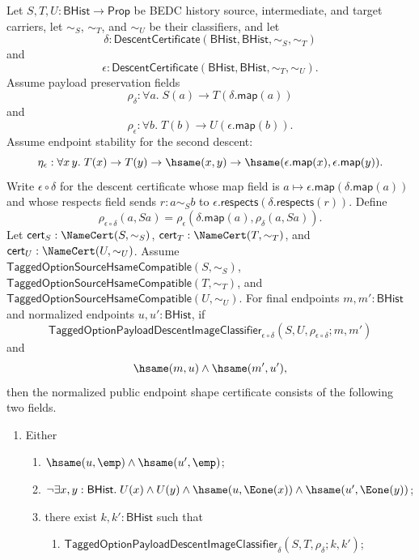 \begin{theorem}
\label{thm:tagged-option-composite-image-classifier-normalized-public-endpoint-shape-certificate}
Let $S,T,U:\mathsf{BHist}\to\mathsf{Prop}$ be BEDC history source,
intermediate, and target carriers, let $\sim_S$, $\sim_T$, and $\sim_U$ be their
classifiers, and let
$$
\delta:\mathsf{DescentCertificate}(\mathsf{BHist},\mathsf{BHist},\sim_S,\sim_T)
$$
and
$$
\epsilon:\mathsf{DescentCertificate}(\mathsf{BHist},\mathsf{BHist},\sim_T,\sim_U).
$$
Assume payload preservation fields
$$
\rho_{\delta}:\forall a.\;S(a)\to T(\delta.\mathsf{map}(a))
$$
and
$$
\rho_{\epsilon}:\forall b.\;T(b)\to U(\epsilon.\mathsf{map}(b)).
$$
Assume endpoint stability for the second descent:
$$
\eta_{\epsilon}:\forall x\,y.\;
T(x)\to T(y)\to \hsame(x,y)\to
\hsame(\epsilon.\mathsf{map}(x),\epsilon.\mathsf{map}(y)).
$$
Write $\epsilon\circ\delta$ for the descent certificate whose map field is
$a\mapsto\epsilon.\mathsf{map}(\delta.\mathsf{map}(a))$ and whose respects field
sends $r:a\sim_S b$ to
$\epsilon.\mathsf{respects}(\delta.\mathsf{respects}(r))$. Define
$$
\rho_{\epsilon\circ\delta}(a,Sa)=
\rho_{\epsilon}(\delta.\mathsf{map}(a),\rho_{\delta}(a,Sa)).
$$
Let $\mathsf{cert}_S:\NameCert(S,\sim_S)$,
$\mathsf{cert}_T:\NameCert(T,\sim_T)$, and
$\mathsf{cert}_U:\NameCert(U,\sim_U)$. Assume
$\mathsf{TaggedOptionSourceHsameCompatible}(S,\sim_S)$,
$\mathsf{TaggedOptionSourceHsameCompatible}(T,\sim_T)$, and
$\mathsf{TaggedOptionSourceHsameCompatible}(U,\sim_U)$. For final endpoints
$m,m':\mathsf{BHist}$ and normalized endpoints $u,u':\mathsf{BHist}$, if
$$
\mathsf{TaggedOptionPayloadDescentImageClassifier}_{\epsilon\circ\delta}
(S,U,\rho_{\epsilon\circ\delta};m,m')
$$
and
$$
\hsame(m,u)\land \hsame(m',u'),
$$
then the normalized public endpoint shape certificate consists of the following
two fields.
\begin{enumerate}
\item Either
\begin{enumerate}
\item $\hsame(u,\emp)\land \hsame(u',\emp)$;
\item $\neg\exists x,y:\mathsf{BHist}.\;
U(x)\land U(y)\land
\hsame(u,\Eone(x))\land
\hsame(u',\Eone(y))$;
\item there exist $k,k':\mathsf{BHist}$ such that
\begin{enumerate}
\item $\mathsf{TaggedOptionPayloadDescentImageClassifier}_{\delta}
(S,T,\rho_{\delta};k,k')$;

\end{enumerate}
\end{enumerate}
\end{enumerate}
\end{theorem}
